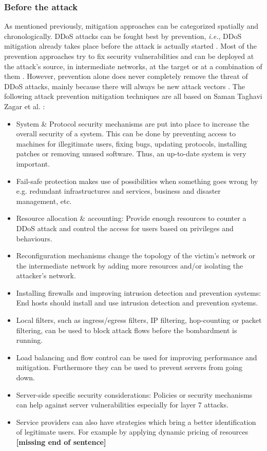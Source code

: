 \subsubsection*{Before the attack}
As mentioned previously, mitigation approaches can be categorized spatially and chronologically. DDoS attacks can be fought best by prevention, \emph{i.e.}, DDoS mitigation already takes place before the attack is actually started \cite{DDoS-MitigationSurvey}. Most of the prevention approaches try to fix security vulnerabilities and can be deployed at the attack's source, in intermediate networks, at the target or at a combination of them \cite{DDoS-MitigationSurvey}. However, prevention alone does never completely remove the threat of DDoS attacks, mainly because there will always be new attack vectors \cite{DDoS-MitigationSurvey}. The following attack prevention mitigation techniques are all based on Saman Taghavi Zagar et al. \cite{DDoS-MitigationSurvey}:
\begin{itemize}
    \item System \& Protocol security mechanisms are put into place to increase the overall security of a system. This can be done by preventing access to machines for illegitimate users, fixing bugs, updating protocols, installing patches or removing unused software. Thus, an up-to-date system is very important. 
    \item Fail-safe protection makes use of possibilities when something goes wrong by e.g. redundant infrastructures and services, business and disaster management, etc.
    \item Resource allocation \& accounting: Provide enough resources to counter a DDoS attack and control the access for users based on privileges and behaviours. 
    \item Reconfiguration mechanisms change the topology of the victim's network or the intermediate network by adding more resources and/or isolating the attacker's network.
    \item Installing firewalls and improving intrusion detection and prevention systems: End hosts should install and use intrusion detection and prevention systems. 
    \item Local filters, such as ingress/egress filters, IP filtering, hop-counting or packet filtering, can be used to block attack flows before the bombardment is running. 
    \item Load balancing and flow control can be used for improving performance and mitigation. Furthermore they can be used to prevent servers from going down. 
    \item Server-side specific security considerations: Policies or security mechanisms can help against server vulnerabilities especially for layer 7 attacks. 
    \item Service providers can also have strategies which bring a better identification of legitimate users. For example by applying dynamic pricing of resources \textbf{[missing end of sentence]} %
\end{itemize}


